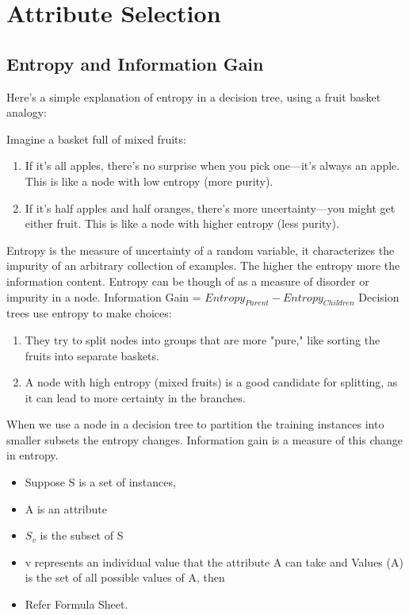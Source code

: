 \section{Attribute Selection}

    \subsection{Entropy and Information Gain}
        Here's a simple explanation of entropy in a decision tree, using a fruit basket analogy:

        Imagine a basket full of mixed fruits:
        \begin{enumerate}
            \item If it's all apples, there's no surprise when you pick one—it's always an apple. This is like a node with low entropy (more purity).
            \item If it's half apples and half oranges, there's more uncertainty—you might get either fruit. This is like a node with higher entropy (less purity).
        \end{enumerate}
        Entropy is the measure of uncertainty of a random variable, it characterizes the impurity of an arbitrary collection of examples. The higher the entropy more the information content. Entropy can be though of as a measure of disorder or impurity in a node. 
        Information Gain  = $Entropy_{Parent} - Entropy_{Children}$
        Decision trees use entropy to make choices:
        \begin{enumerate}
            \item They try to split nodes into groups that are more "pure," like sorting the fruits into separate baskets.
            \item A node with high entropy (mixed fruits) is a good candidate for splitting, as it can lead to more certainty in the branches.
        \end{enumerate}
        When we use a node in a decision tree to partition the training instances into smaller subsets the entropy changes. Information gain is a measure of this change in entropy.
        \begin{itemize}
            \item Suppose S is a set of instances,
            \item A is an attribute
            \item $S_v$ is the subset of S
            \item v represents an individual value that the attribute A can take and Values (A) is the set of all possible values of A, then
            \item Refer Formula Sheet.
        \end{itemize}
        
